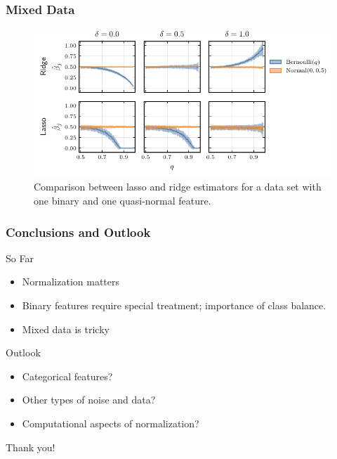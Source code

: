 \documentclass[10pt]{beamer}
\begin{document}
\begin{frame}[c]
  \frametitle{Mixed Data}

  \begin{figure}[htpb]
    \centering
    \includegraphics[width=\textwidth]{images/paper6-mixed_data.pdf}
    \caption{%
      Comparison between lasso and ridge estimators for a data set with one binary and one quasi-normal feature.}
  \end{figure}
\end{frame}

\begin{frame}[c]
  \frametitle{Conclusions and Outlook}

  \begin{block}{So Far}
    \begin{itemize}[<+->]
      \item Normalization matters
      \item Binary features require special treatment; importance of class balance.
      \item Mixed data is tricky
    \end{itemize}

    \pause

    \begin{block}{Outlook}
      \begin{itemize}[<+->]
        \item Categorical features?
        \item Other types of noise and data?
        \item Computational aspects of normalization?
      \end{itemize}
    \end{block}

  \end{block}
\end{frame}

\begin{frame}[standout]
  Thank you!
\end{frame}

% 
\end{document}
